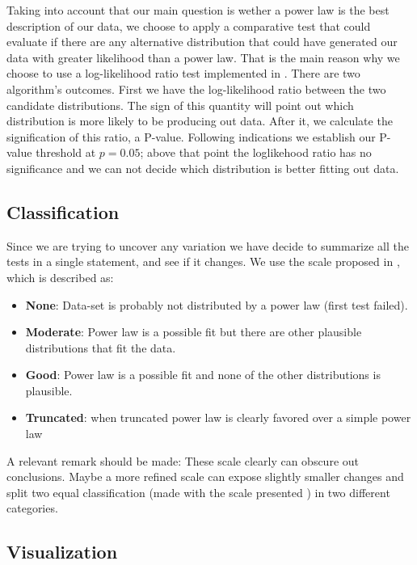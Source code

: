 \documentclass[conference]{IEEEtran}
\begin{document}
Taking into account that our main question is wether a power law is
the best description of our data, we choose to apply a comparative
test that could evaluate if there are any alternative distribution
that could have generated our data with greater likelihood than a
power law. That is the main reason why we choose to use a
log-likelihood ratio test implemented in \cite{alstott2014powerlaw}.
There are two algorithm's outcomes. First we have the log-likelihood
ratio between the two candidate distributions. The sign of this
quantity will point out which distribution is more likely to be
producing out data. After it, we calculate the signification of this
ratio, a P-value. Following \cite{alstott2014powerlaw} indications we
establish our P-value threshold at $p=0.05$; above that point the
loglikehood ratio has no significance and we can not decide which
distribution is better fitting out data.

\subsection{Classification}

Since we are trying to uncover any variation we have decide to
summarize all the tests in a single statement, and see if it
changes. We use the scale proposed in \cite{clauset2009power}, which
is described as:
\begin{itemize}
\item \textbf{None}: Data-set is probably not distributed by a power
  law (first test failed).
\item \textbf{Moderate}: Power law is a possible fit but there are
  other plausible distributions that fit the data.
\item \textbf{Good}: Power law is a possible fit and none of the other
  distributions is plausible.
\item \textbf{Truncated}: when truncated power law is clearly favored
  over a simple power law
\end{itemize}

A relevant remark should be made: These scale clearly can obscure out
conclusions.  Maybe a more refined scale can expose slightly smaller
changes and split two equal classification (made with the scale
presented ) in two different categories.

\subsection{Visualization}
 
\end{document}
